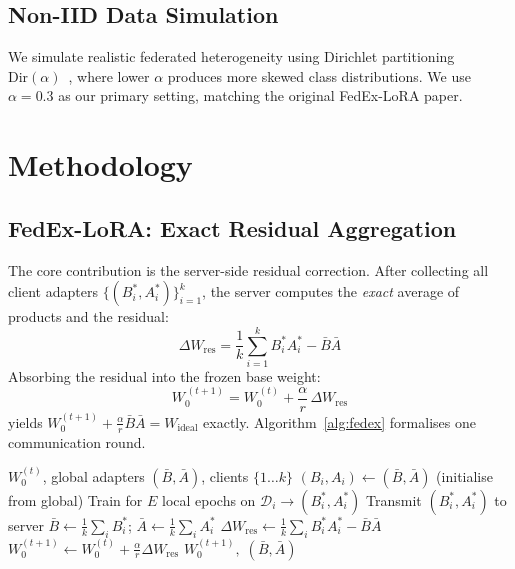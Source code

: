 \documentclass[conference]{IEEEtran}
\begin{document}
\subsection{Non-IID Data Simulation}
We simulate realistic federated heterogeneity using Dirichlet partitioning
$\mathrm{Dir}(\alpha)$~\cite{b_hsu}, where lower $\alpha$ produces more
skewed class distributions. We use $\alpha=0.3$ as our primary setting,
matching the original FedEx-LoRA paper.

\section{Methodology}
\label{sec:method}

\subsection{FedEx-LoRA: Exact Residual Aggregation}

The core contribution is the server-side residual correction.
After collecting all client adapters $\{(B_i^*, A_i^*)\}_{i=1}^k$, the
server computes the \emph{exact} average of products and the residual:
\begin{equation}
  \Delta W_{\mathrm{res}} = \frac{1}{k}\sum_{i=1}^k B_i^* A_i^*
                            - \bar{B}\bar{A}
  \label{eq:residual}
\end{equation}
Absorbing the residual into the frozen base weight:
\begin{equation}
  W_0^{\,(t+1)} = W_0^{\,(t)} + \frac{\alpha}{r}\,\Delta W_{\mathrm{res}}
  \label{eq:absorb}
\end{equation}
yields $W_0^{(t+1)} + \frac{\alpha}{r}\bar{B}\bar{A} = W_{\mathrm{ideal}}$
exactly. Algorithm~\ref{alg:fedex} formalises one communication round.

\begin{algorithm}[t]
\caption{FedEx-LoRA: One Communication Round}
\label{alg:fedex}
\begin{algorithmic}[1]
\REQUIRE $W_0^{(t)}$, global adapters $(\bar{B},\bar{A})$, clients $\{1\ldots k\}$
  \STATE $(B_i, A_i) \leftarrow (\bar{B}, \bar{A})$ \quad (initialise from global)
  \STATE Train for $E$ local epochs on $\mathcal{D}_i \to (B_i^*, A_i^*)$
  \STATE Transmit $(B_i^*, A_i^*)$ to server
\ENDFOR
\STATE $\bar{B} \leftarrow \frac{1}{k}\sum_i B_i^*$;\quad
       $\bar{A} \leftarrow \frac{1}{k}\sum_i A_i^*$
\STATE $\Delta W_{\mathrm{res}} \leftarrow \frac{1}{k}\sum_i B_i^* A_i^* - \bar{B}\bar{A}$
\STATE $W_0^{(t+1)} \leftarrow W_0^{(t)} + \frac{\alpha}{r}\Delta W_{\mathrm{res}}$
\RETURN $W_0^{(t+1)},\; (\bar{B},\bar{A})$
\end{algorithmic}
\end{algorithm}
\end{document}
